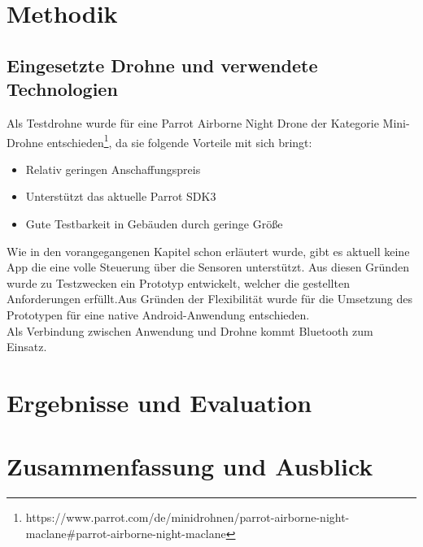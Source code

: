 \documentclass{article}
\begin{document}
\section{Methodik}

\subsection{Eingesetzte Drohne und verwendete Technologien}
Als Testdrohne wurde für eine Parrot Airborne Night Drone der Kategorie Mini-Drohne entschieden\footnote{https://www.parrot.com/de/minidrohnen/parrot-airborne-night-maclane#parrot-airborne-night-maclane}, da sie folgende Vorteile mit sich bringt: 
\begin{itemize}
	\item Relativ geringen Anschaffungspreis
	\item Unterstützt das aktuelle Parrot SDK3
	\item Gute Testbarkeit in Gebäuden durch geringe Größe 
\end{itemize}

Wie in den vorangegangenen Kapitel schon erläutert wurde, gibt es aktuell keine App die eine volle Steuerung über die Sensoren unterstützt. Aus diesen Gründen wurde zu Testzwecken ein Prototyp entwickelt, welcher die gestellten Anforderungen erfüllt.Aus Gründen der Flexibilität wurde für die Umsetzung des Prototypen für eine native Android-Anwendung entschieden.\\ Als Verbindung zwischen Anwendung und Drohne kommt Bluetooth zum Einsatz. 

\subsection{}

\section{Ergebnisse und Evaluation}


\section{Zusammenfassung und Ausblick}
{}

\end{document}
